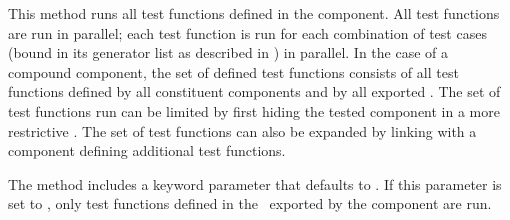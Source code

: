 This method runs all test functions defined in the component.
All test functions are run in parallel;
each test function is run for each
combination of test cases (bound in its generator list as described in
) in parallel. 
In the case of a compound component,
the set of defined test functions consists of
all test functions defined by all constituent components and by all
exported \apisN.  The set of test functions run can be limited by
first hiding the tested component in a more restrictive \apiN. 
The set of test functions can also be expanded by linking with a component
defining additional test functions. 

The  method includes a keyword parameter  that
defaults to .  If this parameter is set to , only test
functions defined in the \apisN\ exported by the component are run.
